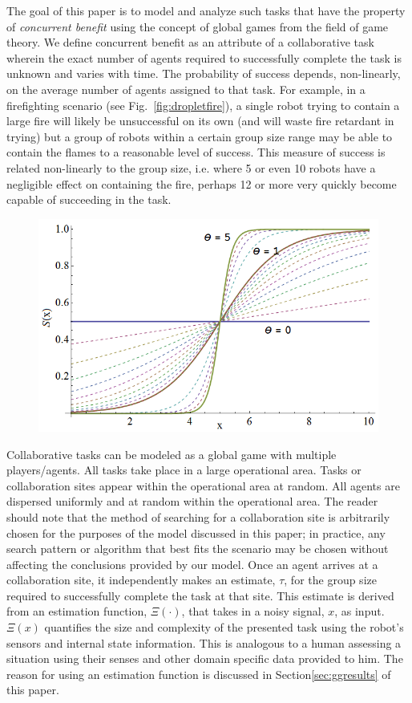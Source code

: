 \documentclass[conference]{IEEEtran}
\begin{document}
The goal of this paper is to model and analyze such tasks that have the property of \emph{concurrent benefit} using the concept of global games from the field of game theory. We define concurrent benefit as an attribute of a collaborative task wherein the exact number of agents required to successfully complete the task is unknown and varies with time. The probability of success depends, non-linearly, on the average number of agents assigned to that task. For example, in a firefighting scenario (see Fig.~\ref{fig:dropletfire}), a single robot trying to contain a large fire will likely be unsuccessful on its own (and will waste fire retardant in trying) but a group of robots within a certain group size range may be able to contain the flames to a reasonable level of success. This measure of success is related non-linearly to the group size, i.e. where 5 or even 10 robots have a negligible effect on containing the fire, perhaps 12 or more very quickly become capable of succeeding in the task.



\begin{figure}[!ht]
\centering\includegraphics[width=\columnwidth]{../figures/sigmoid1.png}
\centering\caption{}\label{fig:sigmoid}
\end{figure}

Collaborative tasks can be modeled as a global game with multiple players/agents. All tasks take place in a large operational area. Tasks or collaboration sites appear within the operational area at random. All agents are dispersed uniformly and at random within the operational area. The reader should note that the method of searching for a collaboration site is arbitrarily chosen for the purposes of the model discussed in this paper; in practice, any search pattern or algorithm that best fits the scenario may be chosen without affecting the conclusions provided by our model. Once an agent arrives at a collaboration site, it independently makes an estimate, $\tau$, for the group size required to successfully complete the task at that site. This estimate is derived from an estimation function, $\Xi(\cdot)$, that takes in a noisy signal, $x$, as input. $\Xi(x)$ quantifies the size and complexity of the presented task using the robot's sensors and internal state information. This is analogous to a human assessing a situation using their senses and other domain specific data provided to him. The reason for using an estimation function is discussed in Section\ref{sec:ggresults} of this paper.
\end{document}

